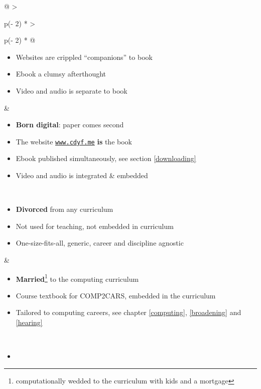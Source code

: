 \documentclass[
]{book}
\providecommand{\tightlist}{%
  \setlength{\itemsep}{0pt}\setlength{\parskip}{0pt}}
\begin{document}
\begin{longtable}[]{@{}
  >{\raggedright\arraybackslash}p{(\columnwidth - 2\tabcolsep) * }
  >{\raggedright\arraybackslash}p{(\columnwidth - 2\tabcolsep) * }@{}}
\begin{minipage}[t]{\linewidth}
\begin{itemize}
  \textbf{Born printed}: digital comes second
\item
  Websites are crippled ``companions'' to book
\item
  Ebook a clumsy afterthought
\item
  Video and audio is separate to book
\end{itemize}
\end{minipage} & \begin{minipage}[t]{\linewidth}\raggedright
\begin{itemize}
\tightlist
\item
  \textbf{Born digital}: paper comes second
\item
  The website \href{https://www.cdyf.me/}{\texttt{www.cdyf.me}} \textbf{is } the book
\item
  Ebook published simultaneously, see section \ref{downloading}
\item
  Video and audio is integrated \& embedded
\end{itemize}
\end{minipage} \\
\begin{minipage}[t]{\linewidth}\raggedright
\begin{itemize}
\tightlist
\item
  \textbf{Divorced} from any curriculum
\item
  Not used for teaching, not embedded in curriculum
\item
  One-size-fits-all, generic, career and discipline agnostic
\end{itemize}
\end{minipage} & \begin{minipage}[t]{\linewidth}\raggedright
\begin{itemize}
\tightlist
\item
  \textbf{Married}\footnote{computationally wedded to the curriculum with kids and a mortgage} to the computing curriculum
\item
  Course textbook for COMP2CARS, embedded in the curriculum
\item
  Tailored to computing careers, see chapter \ref{computing}, \ref{broadening} and \ref{hearing}
\end{itemize}
\end{minipage} \\
\begin{minipage}[t]{\linewidth}\raggedright
\begin{itemize}
\tightlist
\item

\end{itemize}
\end{minipage}
\end{longtable}
\end{document}

